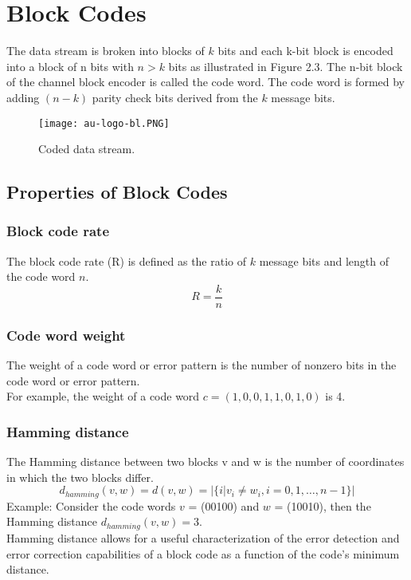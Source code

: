 \section{Block Codes}
The data stream is broken into blocks of $k$ bits and each k-bit block is encoded into a block of n bits with $n > k$ bits as illustrated in Figure 2.3. The n-bit block of the channel block encoder is called the code word. The code word is formed by adding $(n - k)$ parity check bits derived from the $k$ message bits.
\begin{figure}[ht]
    \centering
    \texttt{[image: au-logo-bl.PNG]}
    \caption{Coded data stream.}
\end{figure}

\subsection*{Properties of Block Codes}

\subsubsection*{Block code rate}
The block code rate (R) is defined as the ratio of $k$ message bits and length of the code word $n$.
\[R = \frac{k}{n} \]

\subsubsection*{Code word weight}
The weight of a code word or error pattern is the number of nonzero bits in the code word or error pattern. \\
For example, the weight of a code word $c = (1, 0, 0, 1, 1, 0, 1, 0)$ is 4.

\subsubsection*{Hamming distance}
The Hamming distance between two blocks v and w is the number of coordinates in which the two blocks differ.
\[ d_{hamming}(v,w) = d(v,w) = | \{i | v_i \neq w_i, i = 0,1,\ldots,n-1 \} | \]
Example: Consider the code words $v$ = (00100) and $w$ = (10010), then the Hamming distance $d_{hamming}(v, w) = 3$. \\
Hamming distance allows for a useful characterization of the error detection and error correction capabilities of a block code as a function of the code's minimum distance.

